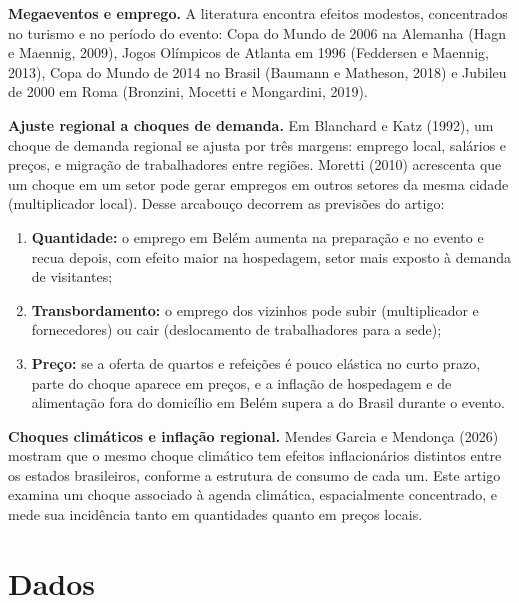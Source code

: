 \documentclass[12pt,a4paper]{article}
\begin{document}
\textbf{Megaeventos e emprego.} A literatura encontra efeitos modestos, concentrados no turismo e no
período do evento: Copa do Mundo de 2006 na Alemanha (Hagn e Maennig, 2009), Jogos Olímpicos de
Atlanta em 1996 (Feddersen e Maennig, 2013), Copa do Mundo de 2014 no Brasil (Baumann e Matheson,
2018) e Jubileu de 2000 em Roma (Bronzini, Mocetti e Mongardini, 2019).

\textbf{Ajuste regional a choques de demanda.} Em Blanchard e Katz (1992), um choque de demanda
regional se ajusta por três margens: emprego local, salários e preços, e migração de trabalhadores
entre regiões. Moretti (2010) acrescenta que um choque em um setor pode gerar empregos em outros
setores da mesma cidade (multiplicador local). Desse arcabouço decorrem as previsões do artigo:
\begin{enumerate}\itemsep0pt
\item \textbf{Quantidade:} o emprego em Belém aumenta na preparação e no evento e recua depois, com
efeito maior na hospedagem, setor mais exposto à demanda de visitantes;
\item \textbf{Transbordamento:} o emprego dos vizinhos pode subir (multiplicador e fornecedores) ou
cair (deslocamento de trabalhadores para a sede);
\item \textbf{Preço:} se a oferta de quartos e refeições é pouco elástica no curto prazo, parte do
choque aparece em preços, e a inflação de hospedagem e de alimentação fora do domicílio em Belém
supera a do Brasil durante o evento.
\end{enumerate}

\textbf{Choques climáticos e inflação regional.} Mendes Garcia e Mendonça (2026) mostram que o mesmo
choque climático tem efeitos inflacionários distintos entre os estados brasileiros, conforme a
estrutura de consumo de cada um. Este artigo examina um choque associado à agenda climática,
espacialmente concentrado, e mede sua incidência tanto em quantidades quanto em preços locais.

\section{Dados}
\end{document}
